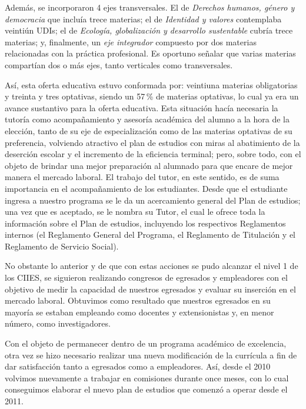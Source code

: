 Además, se incorporaron 4 ejes transversales. El de {\itshape Derechos humanos, 
género y democracia\/} que incluía trece materias;  el de {\itshape Identidad y 
valores\/} contemplaba veintiún UDIs; el de {\itshape Ecología, globalización y 
desarrollo sustentable\/} cubría trece materias; y, finalmente, un 
{\itshape eje integrador\/} compuesto por dos materias relacionadas con la práctica 
profesional. Es oportuno señalar que varias materias compartían dos o 
más ejes, tanto verticales como transversales. 

Así, esta oferta educativa estuvo conformada por: veintiuna materias 
obligatorias y treinta y tres optativas, siendo un 57\,\% de materias 
optativas, lo cual ya era un avance sustantivo para la oferta educativa. 
Esta situación hacía necesaria la tutoría como acompañamiento y 
asesoría académica del alumno a  la hora de la elección, tanto de su eje de 
especialización como de las materias optativas de su preferencia, 
volviendo atractivo el plan de estudios con miras al abatimiento de la 
deserción escolar y el incremento de la eficiencia terminal; pero, sobre todo, 
con el objeto de brindar una mejor preparación al alumnado para que
encare de mejor manera el mercado laboral. El trabajo del tutor, en este
sentido, es de suma importancia en el acompañamiento de los 
estudiantes. Desde que el estudiante ingresa a nuestro programa se le 
da un acercamiento general del Plan de estudios; una vez que es 
aceptado, se le nombra su Tutor, el cual le ofrece toda la información 
sobre el Plan de estudios, incluyendo los respectivos Reglamentos internos 
(el Reglamento General del Programa, el Reglamento de  Titulación y el 
Reglamento de Servicio Social).

\enlargethispage{1\baselineskip}
No obstante lo anterior y de que con estas acciones se pudo 
alcanzar el nivel 1 de los CIIES, se siguieron realizando congresos de egresados y 
empleadores con el objetivo de medir la capacidad de nuestros egresados 
y evaluar su inserción en el mercado laboral. Obtuvimos como resultado 
que nuestros egresados en su mayoría se estaban empleando como docentes y 
extensionistas y, en menor número, como investigadores.

 
Con el objeto de permanecer dentro de un programa académico de excelencia, 
otra vez se hizo necesario realizar una nueva modificación de la 
currícula a fin de dar satisfacción tanto a egresados como a 
empleadores. Así, desde el 2010 volvimos nuevamente a trabajar en comisiones  
durante once meses, con lo cual conseguimos elaborar el nuevo plan de estudios 
que comenzó a operar desde el 2011.

